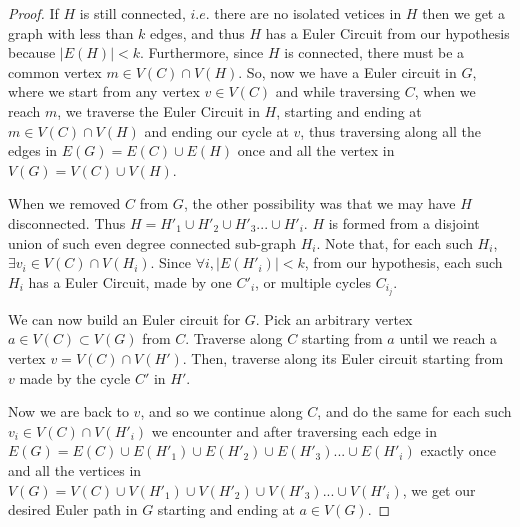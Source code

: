\documentclass[12pt, fullpage]{article}
\begin{document}
\begin{enumerate}
\begin{proof}
 	  If $H$ is still connected, $i.e.$ there are no isolated vetices in $H$ then we get a graph with less than $k$ edges, and thus $H$ has a Euler Circuit from our hypothesis because $\vert E(H) \vert < k$. Furthermore, since $H$ is connected, there must be a common vertex $m \in V(C) \cap V(H)$. So, now we have a Euler circuit in $G$, where we start from any vertex $v \in V(C)$ and while traversing $C$, when we reach $m$, we traverse the Euler Circuit in $H$, starting and ending at $m \in V(C) \cap V(H)$ and ending our cycle at $v$, thus traversing along all the edges in $E(G) = E(C) \cup E(H)$ once and all the vertex in $V(G) = V(C) \cup V(H)$.
 	 
 	   When we removed $C$ from $G$, the other possibility was that we may have $H$ disconnected. Thus $H = H'_1 \cup H'_2 \cup H'_3 ... \cup H'_i$. $H$ is formed from a disjoint union of such even degree connected sub-graph $H_i$. Note that, for each such $H_i$, $\exists v_i \in V(C) \cap V(H_i)$. Since $\forall i, \vert E(H'_i) \vert < k$, from our hypothesis, each such $H_i$ has a Euler Circuit, made by one $C'_i$, or multiple cycles $C_{i_j}$.
 	   
 	   We can now build an Euler circuit for $G$. Pick an arbitrary vertex $a \in V(C) \subset V(G)$ from $C$. Traverse along $C$ starting from $a$ until we reach a vertex $v = V(C) \cap V(H')$. Then, traverse along its Euler circuit starting from $v$ made by the cycle $C'$ in $H'$. 
 	   
 	   Now we are back to $v$, and so we continue along $C$, and do the same for each such $v_i \in V(C) \cap V(H'_i)$ we encounter and after traversing each edge in $E(G) = E(C) \cup E(H'_1)\cup E(H'_2) \cup E(H'_3)... \cup E(H'_i)$ exactly once and all the vertices in $V(G) = V(C) \cup V(H'_1)\cup V(H'_2) \cup V(H'_3)... \cup V(H'_i)$, we get our desired Euler path in $G$ starting and ending at $a \in V(G)$.
 	  

\end{proof}
\end{enumerate}
\end{document}
